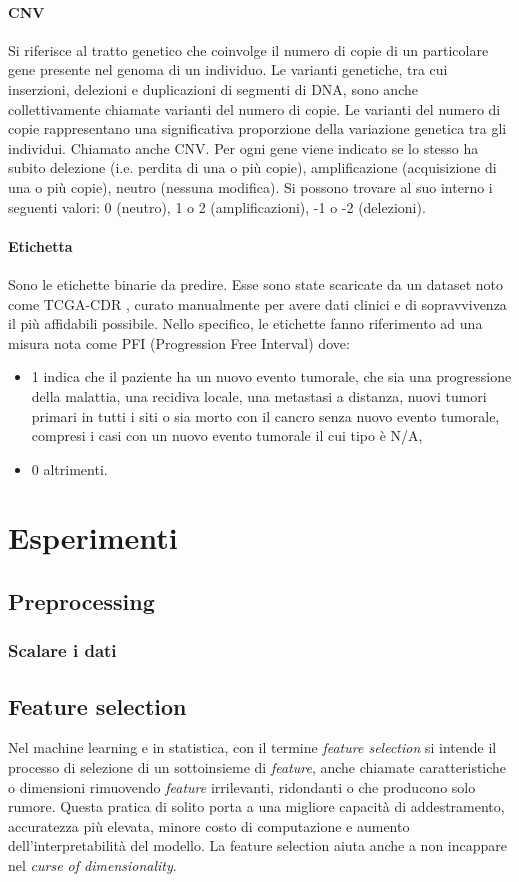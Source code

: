 \documentclass[12pt,italian]{report}
\begin{document}
	\subsubsection{CNV}
	Si riferisce al tratto genetico che coinvolge il numero di copie di un particolare gene presente nel genoma di un individuo. Le varianti genetiche, tra cui inserzioni, delezioni e duplicazioni di segmenti di DNA, sono anche collettivamente chiamate varianti del numero di copie. Le varianti del numero di copie rappresentano una significativa proporzione della variazione genetica tra gli individui. Chiamato anche CNV. Per ogni gene viene indicato se lo stesso ha subito delezione (i.e. perdita di una o più copie), amplificazione (acquisizione di una	o più copie), neutro (nessuna modifica). Si possono trovare al suo interno i seguenti valori: 0 (neutro), 1 o 2 (amplificazioni), -1 o -2 (delezioni).
	
	\subsubsection{Etichetta}
	Sono le etichette binarie da predire. Esse sono state scaricate da un dataset noto come TCGA-CDR \cite{LIU2018400}, curato manualmente per avere	dati clinici e di sopravvivenza il più affidabili possibile. Nello specifico, le etichette fanno riferimento ad una misura nota come PFI (Progression Free Interval) dove: 
	\begin{itemize}
		\item 1 indica che il paziente ha un nuovo evento tumorale, che sia una progressione della malattia, una recidiva locale, una metastasi a distanza, nuovi tumori primari in tutti i siti o sia morto con il cancro senza nuovo evento tumorale, compresi i casi con un nuovo evento tumorale il cui tipo è N/A,
		\item 0 altrimenti.
	\end{itemize}
	
	\chapter{Esperimenti}
	\section{Preprocessing}
	\subsection{Scalare i dati}
	\section{Feature selection}
	Nel machine learning e in statistica, con il termine \textit{feature selection} si intende il processo di selezione di un sottoinsieme di \textit{feature}, anche chiamate caratteristiche o dimensioni rimuovendo \textit{feature} irrilevanti, ridondanti o che producono solo rumore. Questa pratica di solito porta a una migliore capacità di addestramento, accuratezza più elevata, minore costo di computazione e aumento dell'interpretabilità del modello. La feature selection aiuta anche a non incappare nel \textit{curse of dimensionality}.
	
\end{document}
